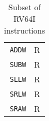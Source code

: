 \begin{table}
\begin{minipage}{0.25\linewidth}
\begin{tabular}{r|l}
            \hline
            \texttt{ADDW} & R    \\
            \texttt{SUBW} & R    \\
            \texttt{SLLW} & R    \\
            \texttt{SRLW} & R    \\
            \texttt{SRAW} & R    \\
            \hline
        \end{tabular}
    \end{minipage}
    \caption[RV64I Instruction Subset]{Subset of RV64I instructions }
    \label{tab:rv64i-instructions}
\end{table}